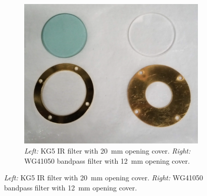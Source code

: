 \begin{figure} [h]
    \centering
    \begin{subfigure}{.45\textwidth}
        \centering
        \includegraphics[width=\textwidth]{pictures/windows_filters_cropped.jpg}
        \captionsetup{width=\textwidth}
        \caption{\emph{Left:} KG5 IR filter with \SI{20}{mm} opening cover. \emph{Right:} WG41050 bandpass filter with \SI{12}{mm} opening cover. }
    \end{subfigure}
    

\end{figure}
